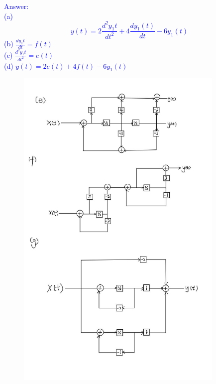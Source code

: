 \documentclass[12pt,a4paper]{article}
\begin{document}
\begin{tcolorbox}
\normalsize
\textcolor{blue}{Answer:\\
(a) $$y(t)=2\frac{d^2y_1t}{dt^2}+4\frac{dy_1(t)}{dt}-6y_1(t)$$
(b) $\frac{dy_1t}{dt}=f(t)$\\
(c) $\frac{d^2y_1t}{dt^2}=e(t)$\\
(d) $y(t)=2e(t)+4f(t)-6y_1(t)$
\begin{figure}[H]
    \centering
    \includegraphics[width=10cm]{5.jpg}
\end{figure}
}
\end{tcolorbox}


\end{document}
